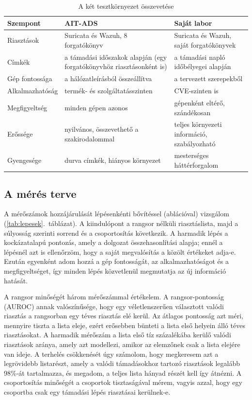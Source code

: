 \begin{table}[H]
    \centering
    \caption{A két tesztkörnyezet összevetése}
    \label{tab:kornyezetek}
    \small
    \begin{tabular}{|L{3.4cm}|L{5.0cm}|L{5.0cm}|}
        \hline
        \textbf{Szempont} & \textbf{AIT-ADS} & \textbf{Saját labor} \\ \hline
        Riasztások & Suricata és Wazuh, 8 forgatókönyv & Suricata és Wazuh, saját forgatókönyvek \\ \hline
        Címkék & a támadási időszakok alapján (egy forgatókönyvhöz riasztásonként is) & a támadási napló időbélyegei alapján \\ \hline
        Gép fontossága & a hálózatleírásból összeállítva & a tervezett szerepekből \\ \hline
        Alkalmazhatóság & termék- és szolgáltatásszinten & \acs{CVE}-szinten is \\ \hline
        Megfigyeltség & minden gépen azonos & gépenként eltérő, szándékosan \\ \hline
        Erőssége & nyilvános, összevethető a szakirodalommal & teljes környezeti információ, szabályozható \\ \hline
        Gyengesége & durva címkék, hiányos környezet & mesterséges háttérforgalom \\ \hline
    \end{tabular}
\end{table}

\subsection{A mérés terve}\label{sec:meresterv}
A mérőszámok hozzájárulását lépésenkénti bővítéssel (ablációval) vizsgálom (\ref{tab:lepesek}.~táblázat). A kiindulópont a rangsor nélküli riasztáslista, majd a súlyosság szerinti sorrend és a csoportosítás következik. A harmadik lépés a kockázatalapú pontozás, amely a dolgozat összehasonlítási alapja; ennél a lépésnél azt is ellenőrzöm, hogy a saját megvalósítás a közölt értékeket adja-e. Ezután egyenként adom hozzá a gép fontosságát, az alkalmazhatóságot és a megfigyeltséget, így minden lépés közvetlenül megmutatja az új információ hatását.

A rangsor minőségét három mérőszámmal értékelem. A rangsor-pontosság (\ac{AUROC}) annak valószínűsége, hogy egy véletlenszerűen választott valódi riasztás a rangsorban egy téves riasztás elé kerül. Az átlagos pontosság azt méri, mennyire tiszta a lista eleje, ezért erősebben bünteti a lista első helyein álló téves riasztásokat. A harmadik mérőszám a lista első tíz százalékába kerülő valódi riasztások aránya, amely azt modellezi, amikor az elemzőnek csak a lista elejére van ideje. A terhelés csökkenését úgy számolom, hogy megkeresem azt a legrövidebb listarészt, amely a valódi támadásokhoz tartozó riasztások legalább 98\%-át tartalmazza, és megadom, a teljes lista hányad részét kell így átnézni. A csoportosítás minőségét a csoportok tisztaságával mérem, vagyis azzal, hogy egy csoportba csak egy támadási lépés riasztásai kerülnek-e.

